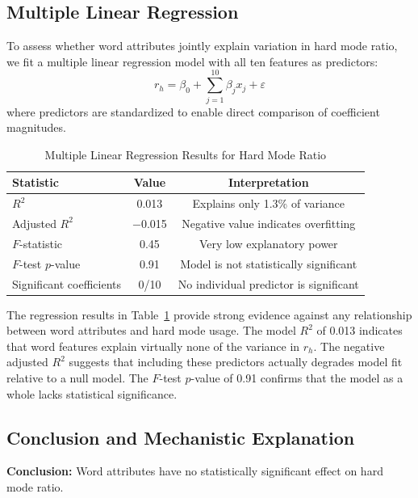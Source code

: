 \documentclass{mcmthesis}
\begin{document}
\subsection{Multiple Linear Regression}

To assess whether word attributes jointly explain variation in hard mode ratio, we fit a multiple linear regression model with all ten features as predictors:
\begin{equation}
r_h = \beta_0 + \sum_{j=1}^{10} \beta_j x_j + \varepsilon
\end{equation}
where predictors are standardized to enable direct comparison of coefficient magnitudes.

\begin{table}[H]
\centering
\caption{Multiple Linear Regression Results for Hard Mode Ratio}
\label{tab:regression_hardmode}
\begin{tabular}{lcc}
\toprule
\textbf{Statistic} & \textbf{Value} & \textbf{Interpretation} \\
\midrule
$R^2$ & 0.013 & Explains only 1.3\% of variance \\
Adjusted $R^2$ & $-$0.015 & Negative value indicates overfitting \\
$F$-statistic & 0.45 & Very low explanatory power \\
$F$-test $p$-value & 0.91 & Model is not statistically significant \\
Significant coefficients & 0/10 & No individual predictor is significant \\
\bottomrule
\end{tabular}
\end{table}

The regression results in Table~\ref{tab:regression_hardmode} provide strong evidence against any relationship between word attributes and hard mode usage. The model $R^2$ of 0.013 indicates that word features explain virtually none of the variance in $r_h$. The negative adjusted $R^2$ suggests that including these predictors actually degrades model fit relative to a null model. The $F$-test $p$-value of 0.91 confirms that the model as a whole lacks statistical significance.

\subsection{Conclusion and Mechanistic Explanation}

\textbf{Conclusion:} Word attributes have no statistically significant effect on hard mode ratio.
\end{document}
